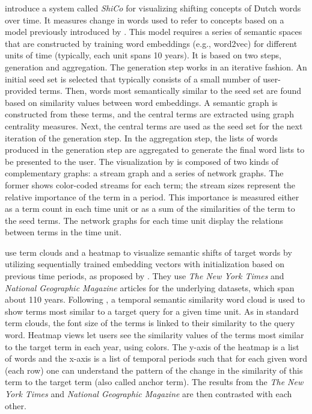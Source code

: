 \documentclass[output=paper%
]{langsci/langscibook}
\begin{document}
\citet{martinez2016design} introduce a system called \emph{ShiCo} for visualizing shifting concepts of Dutch words over time. It measures change in words used to refer to concepts based on a model previously introduced by \citet{kenter2015ad}. This model requires a series of semantic spaces that are constructed by training word embeddings (e.g., word2vec) for different units of time (typically, each unit spans 10 years). It is based on two steps, generation and
aggregation. The generation step works in an iterative fashion. An initial seed set is selected that typically consists of a small number of user-provided terms. Then, words most semantically similar to the seed set are found based on similarity values between word embeddings. A semantic graph is constructed from these terms, and the central terms are extracted using graph centrality measures. Next, the central terms are used as the seed set for the next iteration of the generation step. In the
aggregation step, the lists of words produced in the generation step are aggregated to generate the final word lists to be presented to the user.
The visualization by \citet{martinez2016design} is composed of two kinds of complementary graphs: a stream graph and a series of network graphs. The former shows color-coded streams for each term; the stream sizes represent the relative importance of the term in a period. This importance is measured either as  a term count in each time unit or as a sum of the similarities of the term to the seed terms. The network graphs for each time unit display the relations between terms in the time unit. 

\citet{xu2017temporal} use term clouds and a heatmap to visualize semantic shifts of target words by utilizing sequentially trained embedding vectors with initialization based on previous time periods, as proposed by \citet{kim-etal-2014-temporal}. They use \textit{The New York Times} and \textit{National Geographic Magazine} articles for the underlying datasets, which span about 110 years. Following \citet{martinez2016design}, a temporal semantic similarity word cloud is used to show terms most similar to a target query for a given time unit. As in standard term clouds, the font size of the terms is linked to their similarity to the query word. Heatmap views let users see the similarity values of the terms most similar to the target term in each year, using colors. The y-axis of the heatmap is a list of words and the x-axis is a list of temporal periods such that for each given word (each row) one can understand the pattern of the change in the similarity of this term to the target term (also called anchor term). The results from the \textit{The New York Times} and \textit{National Geographic Magazine} are then contrasted with each other. 
\end{document}
